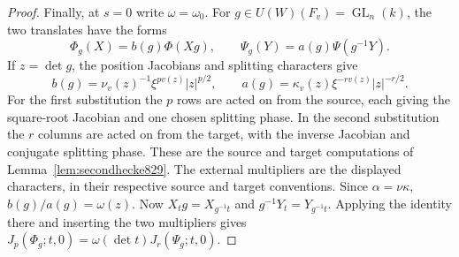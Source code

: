 \documentclass[a4paper,11pt]{article}
\theoremstyle{definition}
\theoremstyle{remark}
\numberwithin{equation}{section}
\begin{document}
\begin{proof}
Finally, at \(s=0\) write \(\omega=\omega_0\).
For \(g\in U(W)(F_v)=\operatorname{GL}_n(k)\), the two
translates have the forms
\[
 \Phi_g(X)=b(g)\Phi(Xg),\qquad
 \Psi_g(Y)=a(g)\Psi(g^{-1}Y).
\]
If \(z=\det g\), the position Jacobians and splitting
characters give
\[
 b(g)=\nu_v(z)^{-1}\xi^{p v(z)}|z|^{p/2},\qquad
 a(g)=\kappa_v(z)\xi^{-r v(z)}|z|^{-r/2}.
\]
For the first substitution the \(p\) rows are acted on
from the source, each giving the square-root Jacobian and
one chosen splitting phase. In the second substitution the
\(r\) columns are acted on from the target, with the inverse
Jacobian and conjugate splitting phase. These are the source
and target computations of Lemma~\ref{lem:secondhecke829}.
The external multipliers are the displayed characters,
in their respective source and target conventions.
Since \(\alpha=\nu\kappa\), \(b(g)/a(g)=\omega(z)\).
Now \(X_tg=X_{g^{-1}t}\) and \(g^{-1}Y_t=Y_{g^{-1}t}\).
Applying the identity there and inserting the two multipliers
gives \(J_p(\Phi_g;t,0)=\omega(\det t)J_r(\Psi_g;t,0)\).
\end{proof}
\end{document}
